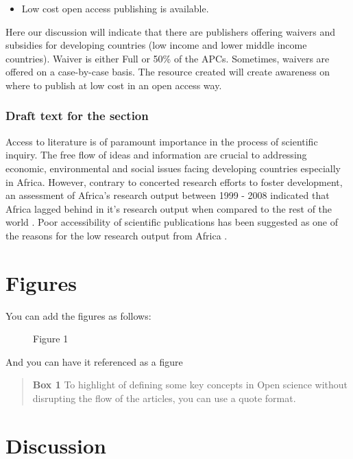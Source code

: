 \begin{itemize}
\tightlist
\item
  Low cost open access publishing is available.
\end{itemize}

Here our discussion will indicate that there are publishers offering
waivers and subsidies for developing countries (low income and lower
middle income countries). Waiver is either Full or 50\% of the APCs.
Sometimes, waivers are offered on a case-by-case basis. The resource
created will create awareness on where to publish at low cost in an open
access way.

\subsubsection{Draft text for the
section}\label{draft-text-for-the-section}

Access to literature is of paramount importance in the process of
scientific inquiry. The free flow of ideas and information are crucial
to addressing economic, environmental and social issues facing
developing countries especially in Africa. However, contrary to
concerted research efforts to foster development, an assessment of
Africa's research output between 1999 - 2008 indicated that Africa
lagged behind in it's research output when compared to the rest of the
world \cite{adams2010;raju2012}. Poor accessibility of scientific
publications has been suggested as one of the reasons for the low
research output from Africa \cite{tise2011;raju2012}.

\section*{Figures}\label{figures}

You can add the figures as follows:

\begin{figure}[htbp]
\centering
\caption{Figure 1}
\end{figure}

And you can have it referenced as a figure

\begin{quote}
\textbf{Box 1} To highlight of defining some key concepts in Open
science without disrupting the flow of the articles, you can use a quote
format.
\end{quote}

\section*{Discussion}\label{discussion}

